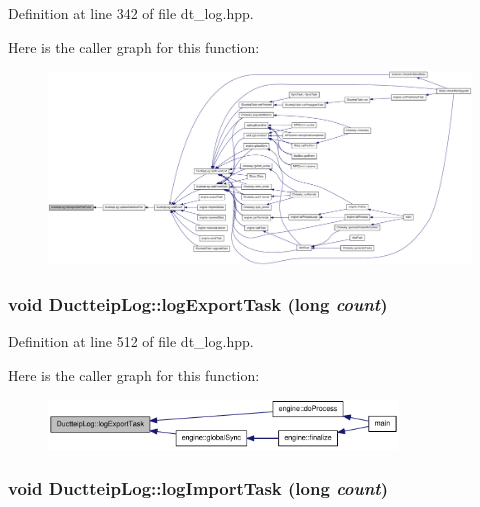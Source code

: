 Definition at line 342 of file dt\_\-log.hpp.

Here is the caller graph for this function:\nopagebreak
\begin{figure}[H]
\begin{center}
\leavevmode
\includegraphics[width=420pt]{class_ductteip_log_acca92822b7606cc0c5d384a3d96c7950_icgraph}
\end{center}
\end{figure}
\hypertarget{class_ductteip_log_a8a3a26ac412cb874ea28fb9ea8a42535}{
\subsubsection[{logExportTask}]{\setlength{\rightskip}{0pt plus 5cm}void DuctteipLog::logExportTask (long {\em count})}}
\label{class_ductteip_log_a8a3a26ac412cb874ea28fb9ea8a42535}


Definition at line 512 of file dt\_\-log.hpp.

Here is the caller graph for this function:\nopagebreak
\begin{figure}[H]
\begin{center}
\leavevmode
\includegraphics[width=263pt]{class_ductteip_log_a8a3a26ac412cb874ea28fb9ea8a42535_icgraph}
\end{center}
\end{figure}
\hypertarget{class_ductteip_log_adcec387e3a205d72e92baba0ea3019c1}{
\subsubsection[{logImportTask}]{\setlength{\rightskip}{0pt plus 5cm}void DuctteipLog::logImportTask (long {\em count})}}
\label{class_ductteip_log_adcec387e3a205d72e92baba0ea3019c1}


